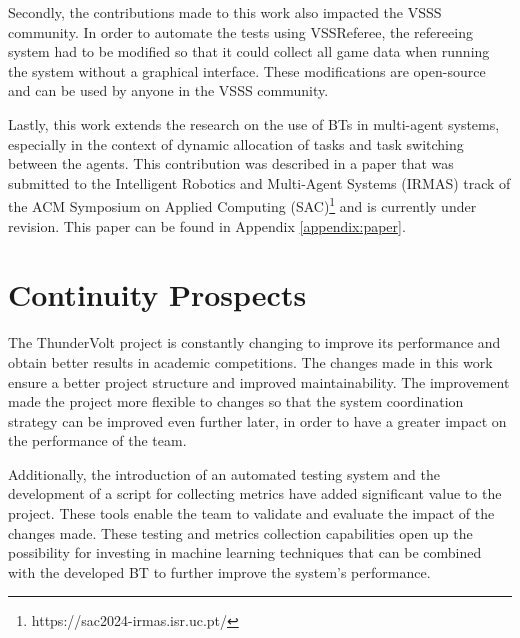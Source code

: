 Secondly, the contributions made to this work also impacted the VSSS community. In order to automate the tests using VSSReferee, the refereeing system had to be modified so that it could collect all game data when running the system without a graphical interface. These modifications are open-source and can be used by anyone in the VSSS community.

Lastly, this work extends the research on the use of BTs in multi-agent systems, especially in the context of dynamic allocation of tasks and task switching between the agents. This contribution was described in a paper that was submitted to the Intelligent Robotics and Multi-Agent Systems (IRMAS) track of the ACM Symposium on Applied Computing (SAC)\footnote{https://sac2024-irmas.isr.uc.pt/} and is currently under revision. This paper can be found in Appendix \ref{appendix:paper}.

\section{Continuity Prospects}

The ThunderVolt project is constantly changing to improve its performance and obtain better results in academic competitions. The changes made in this work ensure a better project structure and improved maintainability. The improvement made the project more flexible to changes so that the system coordination strategy can be improved even further later, in order to have a greater impact on the performance of the team.

Additionally, the introduction of an automated testing system and the development of a script for collecting metrics have added significant value to the project. These tools enable the team to validate and evaluate the impact of the changes made. These testing and metrics collection capabilities open up the possibility for investing in machine learning techniques that can be combined with the developed BT to further improve the system's performance.
